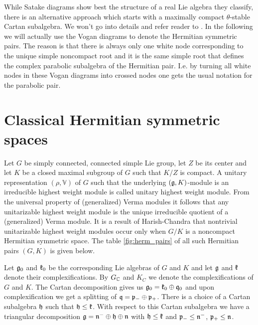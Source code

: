 While Satake diagrams show best the structure of a real Lie algebra they classify, there is an alternative approach which starts with a maximally compact $\theta$-stable Cartan subalgebra. We won't go into details and refer reader to \cite{knapp_lie_1996}. In the following we will actually use the Vogan diagrams to denote the Hermitian symmetric pairs. The reason is that there is always only one white node corresponding to the unique simple noncompact root and it is the same simple root that defines the complex parabolic subalgebra of the Hermitian pair. I.e. by turning all white nodes in these Vogan diagrams into crossed nodes one gets the usual notation for the parabolic pair. 

\section{Classical Hermitian symmetric spaces}


Let $G$ be simply connected, connected simple Lie group, let $Z$ be its center and let $K$ be a closed  maximal subgroup of $G$ such that $K/Z$ is compact. A unitary representation $(\rho,\mathbb{V})$  of $G$ such that the underlying $(\mathfrak{g},K)$-module is an irreducible highest weight module is called unitary highest weight module. From the universal property of (generalized) Verma modules it follows that any unitarizable highest weight module is the unique irreducible quotient of a (generalized) Verma module. It is a result of Harish-Chandra that nontrivial unitarizable highest weight modules occur only when $G/K$ is a noncompact Hermitian symmetric space. The table \ref{fig:herm_pairs} of all such Hermitian pairs $(G,K)$ is given below.

Let $\mathfrak{g}_0$ and $\mathfrak{k}_0$ be the corresponding Lie algebras of $G$ and $K$ and let $\mathfrak{g}$ and $\mathfrak{k}$ denote their complexifications. By $G_{\mathbb{C}}$ and $K_C$ we denote the complexifications of $G$ and $K$. The Cartan decomposition gives us $\mathfrak{g}_0 = \mathfrak{k}_0 \oplus \mathfrak{q}_0$ and upon complexification we get a splitting of  $\mathfrak{q} = \mathfrak{p}_-\oplus\mathfrak{p}_+$. %
There is a choice of a Cartan subalgebra $\mathfrak{h}$ such that $\mathfrak{h} \leq \mathfrak{k}$. With respect to this Cartan subalgebra we have a triangular decomposition $\mathfrak{g}=\mathfrak{n}^-\oplus\mathfrak{h}\oplus\mathfrak{n}$ with $\mathfrak{h} \leq \mathfrak{k}$ and $\mathfrak{p}_-\leq \mathfrak{n}^-$, $\mathfrak{p}_+ \leq \mathfrak{n}$.

